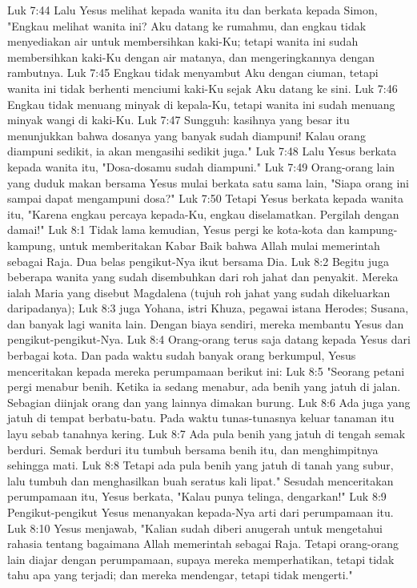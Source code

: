 Luk 7:44  Lalu Yesus melihat kepada wanita itu dan berkata kepada Simon, "Engkau melihat wanita ini? Aku datang ke rumahmu, dan engkau tidak menyediakan air untuk membersihkan kaki-Ku; tetapi wanita ini sudah membersihkan kaki-Ku dengan air matanya, dan mengeringkannya dengan rambutnya.
Luk 7:45  Engkau tidak menyambut Aku dengan ciuman, tetapi wanita ini tidak berhenti menciumi kaki-Ku sejak Aku datang ke sini.
Luk 7:46  Engkau tidak menuang minyak di kepala-Ku, tetapi wanita ini sudah menuang minyak wangi di kaki-Ku.
Luk 7:47  Sungguh: kasihnya yang besar itu menunjukkan bahwa dosanya yang banyak sudah diampuni! Kalau orang diampuni sedikit, ia akan mengasihi sedikit juga."
Luk 7:48  Lalu Yesus berkata kepada wanita itu, "Dosa-dosamu sudah diampuni."
Luk 7:49  Orang-orang lain yang duduk makan bersama Yesus mulai berkata satu sama lain, "Siapa orang ini sampai dapat mengampuni dosa?"
Luk 7:50  Tetapi Yesus berkata kepada wanita itu, "Karena engkau percaya kepada-Ku, engkau diselamatkan. Pergilah dengan damai!"
Luk 8:1  Tidak lama kemudian, Yesus pergi ke kota-kota dan kampung-kampung, untuk memberitakan Kabar Baik bahwa Allah mulai memerintah sebagai Raja. Dua belas pengikut-Nya ikut bersama Dia.
Luk 8:2  Begitu juga beberapa wanita yang sudah disembuhkan dari roh jahat dan penyakit. Mereka ialah Maria yang disebut Magdalena (tujuh roh jahat yang sudah dikeluarkan daripadanya);
Luk 8:3  juga Yohana, istri Khuza, pegawai istana Herodes; Susana, dan banyak lagi wanita lain. Dengan biaya sendiri, mereka membantu Yesus dan pengikut-pengikut-Nya.
Luk 8:4  Orang-orang terus saja datang kepada Yesus dari berbagai kota. Dan pada waktu sudah banyak orang berkumpul, Yesus menceritakan kepada mereka perumpamaan berikut ini:
Luk 8:5  "Seorang petani pergi menabur benih. Ketika ia sedang menabur, ada benih yang jatuh di jalan. Sebagian diinjak orang dan yang lainnya dimakan burung.
Luk 8:6  Ada juga yang jatuh di tempat berbatu-batu. Pada waktu tunas-tunasnya keluar tanaman itu layu sebab tanahnya kering.
Luk 8:7  Ada pula benih yang jatuh di tengah semak berduri. Semak berduri itu tumbuh bersama benih itu, dan menghimpitnya sehingga mati.
Luk 8:8  Tetapi ada pula benih yang jatuh di tanah yang subur, lalu tumbuh dan menghasilkan buah seratus kali lipat." Sesudah menceritakan perumpamaan itu, Yesus berkata, "Kalau punya telinga, dengarkan!"
Luk 8:9  Pengikut-pengikut Yesus menanyakan kepada-Nya arti dari perumpamaan itu.
Luk 8:10  Yesus menjawab, "Kalian sudah diberi anugerah untuk mengetahui rahasia tentang bagaimana Allah memerintah sebagai Raja. Tetapi orang-orang lain diajar dengan perumpamaan, supaya mereka memperhatikan, tetapi tidak tahu apa yang terjadi; dan mereka mendengar, tetapi tidak mengerti."
